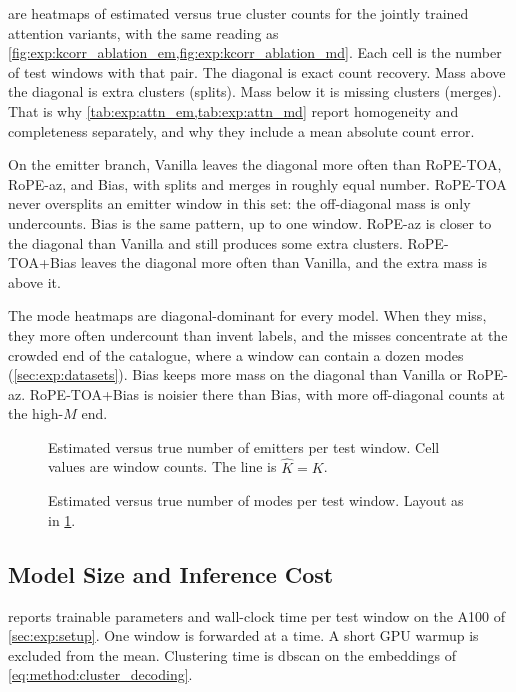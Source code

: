  are heatmaps of estimated versus true cluster counts for the jointly trained attention variants, with the same reading as \cref{fig:exp:kcorr_ablation_em,fig:exp:kcorr_ablation_md}.
Each cell is the number of test windows with that pair.
The diagonal is exact count recovery.
Mass above the diagonal is extra clusters (splits).
Mass below it is missing clusters (merges).
That is why \cref{tab:exp:attn_em,tab:exp:attn_md} report homogeneity and completeness separately, and why they include a mean absolute count error.

On the emitter branch, Vanilla leaves the diagonal more often than RoPE-TOA, RoPE-az, and Bias, with splits and merges in roughly equal number.
RoPE-TOA never oversplits an emitter window in this set: the off-diagonal mass is only undercounts.
Bias is the same pattern, up to one window.
RoPE-az is closer to the diagonal than Vanilla and still produces some extra clusters.
RoPE-TOA+Bias leaves the diagonal more often than Vanilla, and the extra mass is above it.

The mode heatmaps are diagonal-dominant for every model.
When they miss, they more often undercount than invent labels, and the misses concentrate at the crowded end of the catalogue, where a window can contain a dozen modes (\cref{sec:exp:datasets}).
Bias keeps more mass on the diagonal than Vanilla or RoPE-az.
RoPE-TOA+Bias is noisier there than Bias, with more off-diagonal counts at the high-$M$ end.

\begin{figure}[tbp]
  \centering
  \caption{Estimated versus true number of emitters per test window. Cell values are window counts. The line is $\hat{K}=K$.}
  \label{fig:exp:kcorr_em}
\end{figure}

\begin{figure}[tbp]
  \centering
  \caption{Estimated versus true number of modes per test window. Layout as in \cref{fig:exp:kcorr_em}.}
  \label{fig:exp:kcorr_md}
\end{figure}

\subsection{Model Size and Inference Cost}\label{sec:exp:results:efficiency}

 reports trainable parameters and wall-clock time per test window on the A100 of \cref{sec:exp:setup}.
One window is forwarded at a time.
A short GPU warmup is excluded from the mean.
Clustering time is \gls{dbscan} on the embeddings of \cref{eq:method:cluster_decoding}.

